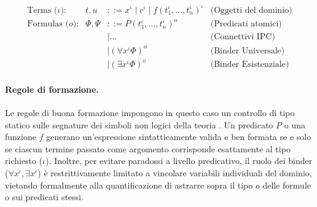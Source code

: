 \begin{equation}
    \begin{array}{lrll}
        \text{Terms ($\iota$):} & t, u       & ::= x^\iota \mid c^\iota \mid f(t_1^\iota, \dots, t_n^\iota)^\iota   & \text{(Oggetti del dominio)} \\
        \text{Formulas ($o$):}  & \Phi, \Psi & ::= P(t_1^\iota, \dots, t_n^\iota)^o \quad                           & \text{(Predicati atomici)}   \\
                                &            & \mid \dots \quad                                                     & \text{(Connettivi IPC)}      \\
                                &            & \mid (\forall x^\iota \Phi)^o \quad                                  & \text{(Binder Universale)}   \\
                                &            & \mid (\exists x^\iota \Phi)^o \quad                                  & \text{(Binder Esistenziale)}
    \end{array}
    \tag{IQC}
    \label{eq:iqc_grammar}
\end{equation}

\paragraph{Regole di formazione.}
Le regole di buona formazione impongono in questo caso un controllo di tipo statico sulle segnature dei simboli non logici della teoria \cite{hindley1997}.  Un predicato $P$ 
o una funzione $f$ generano un'espressione sintatticamente valida e ben formata se e solo se ciascun termine passato come argomento corrisponde esattamente al tipo richiesto 
($\iota$). Inoltre, per evitare paradossi a livello predicativo, il ruolo dei binder ($\forall x^\iota, \exists x^\iota$) è restrittivamente limitato a vincolare variabili 
individuali del dominio, vietando formalmente alla quantificazione di astrarre sopra il tipo $o$ delle formule o sui predicati stessi.